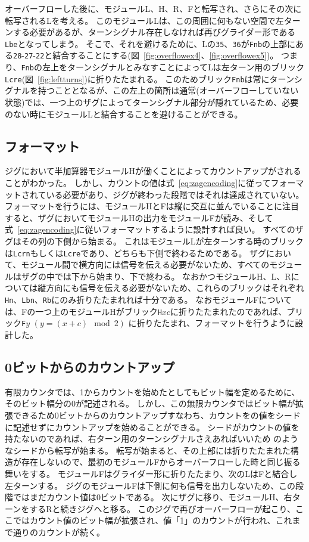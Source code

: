 \documentclass[a4j,11pt]{article}
\begin{document}
オーバーフローした後に、モジュールL、H、R、Fと転写され、さらにその次に転写されるLを考える。
このモジュールLは、この周囲に何もない空間で左ターンする必要があるが、ターンシグナル存在しなければ再びグライダー形である\texttt{Lbe}となってしまう。
そこで、それを避けるために、Lの\texttt{35}、\texttt{36}が\texttt{Fnb}の上部にある\texttt{28}{-}\texttt{27}{-}\texttt{22}と結合することにする(図~\ref{fig:overflowex4}、\ref{fig:overflowex5})。
つまり、\texttt{Fnb}の左上をターンシグナルとみなすことによってLは左ターン用のブリック\texttt{Lcre}(図~\ref{fig:leftturns})に折りたたまれる。
このためブリック\texttt{Fnb}は常にターンシグナルを持つこととなるが、この左上の箇所は通常(オーバーフローしていない状態)では、一つ上のザグによってターンシグナル部分が隠れているため、必要のない時にモジュールLと結合することを避けることができる。


\subsection{フォーマット}
ジグにおいて半加算器モジュールHが働くことによってカウントアップがされることがわかった。
しかし、カウントの値は式~\eqref{eq:zagencoding}に従ってフォーマットされている必要があり、ジグが終わった段階ではそれは達成されていない。
フォーマットを行うには、モジュールHとFは縦に交互に並んでいることに注目すると、ザグにおいてモジュールHの出力をモジュールFが読み、そして式~\eqref{eq:zagencoding}に従いフォーマットするように設計すれば良い。
すべてのザグはその列の下側から始まる。
これはモジュールLが左ターンする時のブリックは\texttt{Lcrn}もしくは\texttt{Lcre}であり、どちらも下側で終わるためである。
ザグにおいて、モジュール間で横方向には信号を伝える必要がないため、すべてのモジュールはザグの中では下から始まり、下で終わる。
なおかつモジュールH、L、Rについては縦方向にも信号を伝える必要がないため、これらのブリックはそれぞれ\texttt{Hn}、\texttt{Lbn}、\texttt{Rb}にのみ折りたたまれれば十分である。
なおモジュールFについては、Fの一つ上のモジュールHがブリック\texttt{H}$xc$に折りたたまれたのであれば、ブリック\texttt{F}$y$ $(y = (x+c) \mod 2)$ に折りたたまれ、フォーマットを行うように設計した。


\subsection{0ビットからのカウントアップ}
有限カウンタでは、1からカウントを始めたとしてもビット幅を定めるために、そのビット幅分の0が記述される。
しかし、この無限カウンタではビット幅が拡張できるため0ビットからのカウントアップすなわち、カウントをの値をシードに記述せずにカウントアップを始めることができる。
シードがカウントの値を持たないのであれば、右ターン用のターンシグナルさえあればいいため%
のようなシードから転写が始まる。
転写が始まると、その上部には折りたたまれた構造が存在しないので、最初のモジュールFからオーバーフローした時と同じ振る舞いをする。
モジュールFはグライダー形に折りたたまり、次のLはFと結合し左ターンする。%
ジグのモジュールFは下側に何も信号を出力しないため、この段階ではまだカウント値は0ビットである。
次にザグに移り、モジュールH、右ターンをするRと続きジグへと移る。
このジグで再びオーバーフローが起こり、ここではカウント値のビット幅が拡張され、値「1」のカウントが行われ、これまで通りのカウントが続く。
\end{document}
